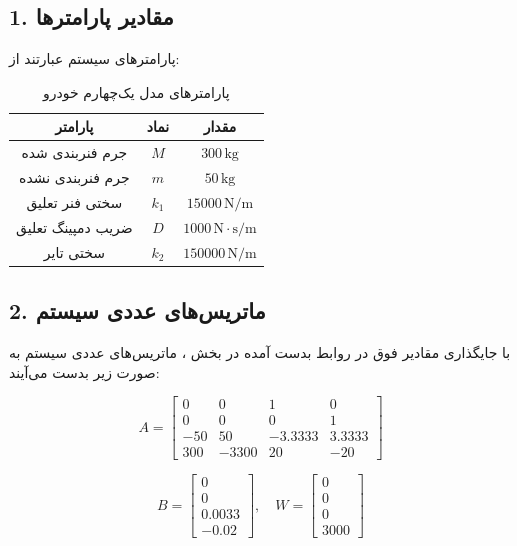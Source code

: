 \documentclass[a4paper]{article}
\begin{document}
	\subsection{1. مقادیر پارامترها}
	پارامترهای سیستم عبارتند از:
	\begin{table}[H]
		\centering
		\caption{پارامترهای مدل یک‌چهارم خودرو}
		\begin{tabular}{ccc}
			\toprule
			\textbf{پارامتر} & \textbf{نماد} & \textbf{مقدار} \\
			\midrule
			جرم فنربندی شده & $M$ & $300 \, \text{kg}$ \\
			جرم فنربندی نشده & $m$ & $50 \, \text{kg}$ \\
			سختی فنر تعلیق & $k_1$ & $15000 \, \text{N/m}$ \\
			ضریب دمپینگ تعلیق & $D$ & $1000 \, \text{N}\cdot\text{s/m}$ \\
			سختی تایر & $k_2$ & $150000 \, \text{N/m}$ \\
			\bottomrule
		\end{tabular}
	\end{table}
	
	\subsection{2. ماتریس‌های عددی سیستم}
	با جایگذاری مقادیر فوق در روابط بدست آمده در بخش ، ماتریس‌های عددی سیستم به صورت زیر بدست می‌آیند:
	
	\begin{equation}
		A = \begin{bmatrix} 
			0 & 0 & 1 & 0 \\
			0 & 0 & 0 & 1 \\
			-50 & 50 & -3.3333 & 3.3333 \\
			300 & -3300 & 20 & -20
		\end{bmatrix}
	\end{equation}
	
	\begin{equation}
		B = \begin{bmatrix} 0 \\ 0 \\ 0.0033 \\ -0.02 \end{bmatrix}, \quad
		W = \begin{bmatrix} 0 \\ 0 \\ 0 \\ 3000 \end{bmatrix}
	\end{equation}
	
\end{document}
